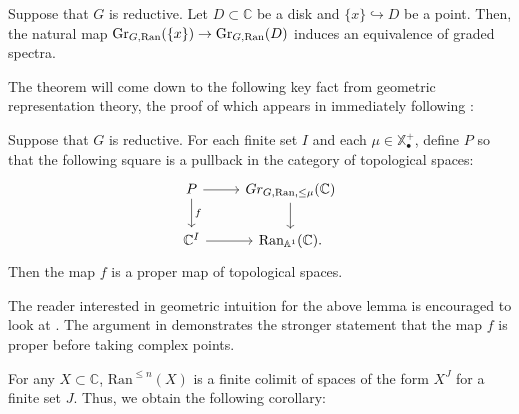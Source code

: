 \begin{prop}\label{prop:diskequiv}
Suppose that $G$ is reductive.  Let $D\subset \mathbb{C}$ be a disk and $\{x \} \hookrightarrow D$ be a point.  Then, the natural map $\operatorname{\mathrm{Gr}}_{G,\operatorname{\mathrm{Ran}}}(\{x\}) \to \operatorname{\mathrm{Gr}}_{G,\operatorname{\mathrm{Ran}}}(D)$ induces an equivalence of graded spectra.  
\end{prop}

The theorem will come down to the following key fact from geometric representation theory, the proof of which appears in \cite{BDQuantization} immediately following \cite[5.3.10]{BDQuantization}:

\begin{lem} \label{lem:grproper}
Suppose that $G$ is reductive.  For each finite set $I$ and each $\mu \in \mathbb{X}_{\bullet}^+$, define $P$ so that the following square is a pullback in the category of topological spaces:
$$
\begin{tikzcd}
P \arrow{r} \arrow{d}{f} & Gr_{G,\text{Ran},\le \mu}(\mathbb{C}) \arrow{d} \\
\mathbb{C}^I \arrow{r} & \text{Ran}_{\mathbb{A}^1}(\mathbb{C}).
\end{tikzcd}
$$
Then the map $f$ is a proper map of topological spaces.
\end{lem}

\begin{rmk}
The reader interested in geometric intuition for the above lemma is encouraged to look at \cite[Proposition 1.2.4]{ZhuDemazure}.  The argument in \cite{BDQuantization} demonstrates the stronger statement that the map $f$ is proper before taking complex points.
\end{rmk}

\begin{comment}
We also need the following point-set lemma:
\begin{lem}\label{lem:colimproper}
Let $I$ be a finite indexing category and $\{X_i\}_{i\in I}$ be a diagram of topological spaces indexed by $I$.  Let $X = \colim_{i\in I} X_i$ and suppose $f: Y \to X$ is a map of topological spaces with the property that for all $i\in I$, the natural map $f_i: Y\times_X X_i \to X_i$ is proper.  Then the map $f$ is proper.
\end{lem}
\begin{proof}

\end{proof}
\end{comment}

For any $X\subset \mathbb{C}$, $\mathrm{Ran}^{\leq n}(X)$ is a finite colimit of spaces of the form $X^J$ for a finite set $J$.  Thus, we obtain the following corollary:

